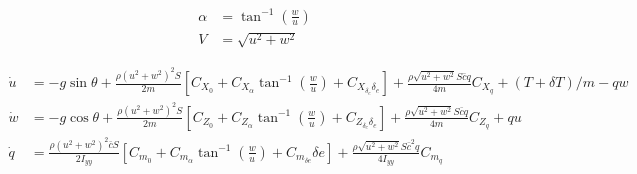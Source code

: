 \documentclass{article}
\begin{document}
\iffalse 
\begin{align*}
\alpha &= \tan^{-1}(\frac{w}{u})\\
V &= \sqrt{u^2+w^2}
\end{align*}


\begin{align*}
  \dot{u} &= -g \sin \theta + \frac{\rho (u^2 + w^2)^2 S}{2m}\left [ C_{X_0} + C_{X_\alpha}\tan^{-1}(\frac{w}{u}) + C_{X_{\delta_e}\delta_e} \right ] + \frac{\rho \sqrt{u^2+w^2}S\bar{c}q}{4m}C_{X_q}+ (T+\delta T)/m - qw \\
  \dot{w} &= -g \cos \theta + \frac{\rho (u^2 + w^2)^2 S}{2m}\left [ C_{Z_0} + C_{Z_\alpha}\tan^{-1}(\frac{w}{u}) + C_{Z_{\delta_e}\delta_e} \right ] + \frac{\rho \sqrt{u^2+w^2}S\bar{c}q}{4m}C_{Z_q}+ qu \\
  \dot{q} &= \frac{\rho (u^2+w^2)^2\bar{c}S}{2I_{yy}} \left [C_{m_0} + C_{m_\alpha}\tan^{-1}(\frac{w}{u})+ C_{m_{\delta e}} \delta e \right ] + \frac{\rho \sqrt{u^2+w^2}S\bar{c}^2q}{4I_{yy}}C_{m_q}  \\
\end{align*}
\end{document}
